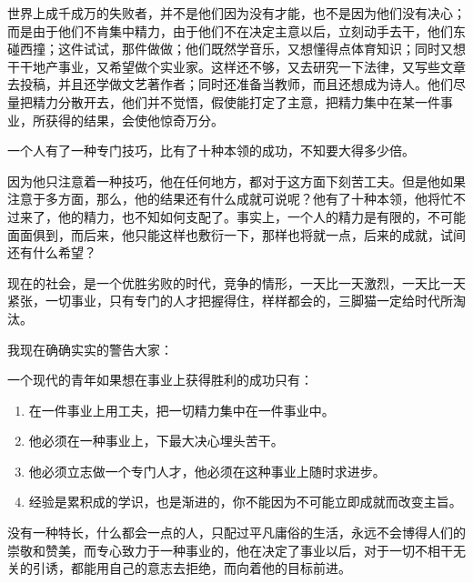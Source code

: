 \documentclass[UTF8,a4paper,8pt]{ctexbook}
\begin{document}
		
		世界上成千成万的失败者，并不是他们因为没有才能，也不是因为他们没有决心；而是由于他们不肯集中精力，由于他们不在决定主意以后，立刻动手去干，他们东碰西撞；这件试试，那件做做；他们既然学音乐，又想懂得点体育知识；同时又想干干地产事业，又希望做个实业家。这样还不够，又去研究一下法律，又写些文章去投稿，并且还学做文艺著作者；同时还准备当教师，而且还想成为诗人。他们尽量把精力分散开去，他们并不觉悟，假使能打定了主意，把精力集中在某一件事业，所获得的结果，会使他惊奇万分。
		
		
		一个人有了一种专门技巧，比有了十种本领的成功，不知要大得多少倍。
		
		
		因为他只注意着一种技巧，他在任何地方，都对于这方面下刻苦工夫。但是他如果注意于多方面，那么，他的结果还有什么成就可说呢？他有了十种本领，他将忙不过来了，他的精力，也不知如何支配了。事实上，一个人的精力是有限的，不可能面面俱到，而后来，他只能这样也敷衍一下，那样也将就一点，后来的成就，试间还有什么希望？
		
		
		现在的社会，是一个优胜劣败的时代，竞争的情形，一天比一天激烈，一天比一天紧张，一切事业，只有专门的人才把握得住，样样都会的，三脚猫一定给时代所淘汰。
		
		
		我现在确确实实的警告大家：
		
		
		一个现代的青年如果想在事业上获得胜利的成功只有：
		
		\begin{enumerate}
			\item 在一件事业上用工夫，把一切精力集中在一件事业中。
			\item 他必须在一种事业上，下最大决心埋头苦干。
			\item 他必须立志做一个专门人才，他必须在这种事业上随时求进步。
			\item 经验是累积成的学识，也是渐进的，你不能因为不可能立即成就而改变主旨。
		\end{enumerate}
		
		没有一种特长，什么都会一点的人，只配过平凡庸俗的生活，永远不会博得人们的崇敬和赞美，而专心致力于一种事业的，他在决定了事业以后，对于一切不相干无关的引诱，都能用自己的意志去拒绝，而向着他的目标前进。 	
		
\end{document}
